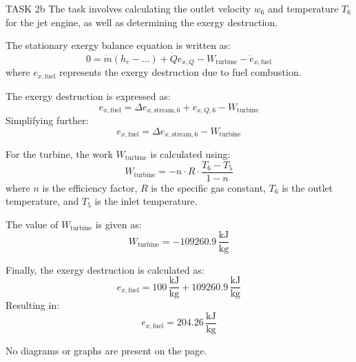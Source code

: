 TASK 2b  
The task involves calculating the outlet velocity \( w_6 \) and temperature \( T_6 \) for the jet engine, as well as determining the exergy destruction.

The stationary exergy balance equation is written as:  
\[
0 = \dot{m} \left( h_e - \ldots \right) + \dot{Q} e_{x,Q} - W_{\text{turbine}} - \dot{e}_{x,\text{fuel}}
\]  
where \( e_{x,\text{fuel}} \) represents the exergy destruction due to fuel combustion.  

The exergy destruction is expressed as:  
\[
e_{x,\text{fuel}} = \Delta e_{x,\text{stream},6} + e_{x,Q,6} - W_{\text{turbine}}
\]  
Simplifying further:  
\[
e_{x,\text{fuel}} = \Delta e_{x,\text{stream},6} - W_{\text{turbine}}
\]  

For the turbine, the work \( W_{\text{turbine}} \) is calculated using:  
\[
W_{\text{turbine}} = -n \cdot R \cdot \frac{T_6 - T_5}{1 - n}
\]  
where \( n \) is the efficiency factor, \( R \) is the specific gas constant, \( T_6 \) is the outlet temperature, and \( T_5 \) is the inlet temperature.  

The value of \( W_{\text{turbine}} \) is given as:  
\[
W_{\text{turbine}} = -109260.9 \, \frac{\text{kJ}}{\text{kg}}
\]  

Finally, the exergy destruction is calculated as:  
\[
e_{x,\text{fuel}} = 100 \, \frac{\text{kJ}}{\text{kg}} + 109260.9 \, \frac{\text{kJ}}{\text{kg}}
\]  
Resulting in:  
\[
e_{x,\text{fuel}} = 204.26 \, \frac{\text{kJ}}{\text{kg}}
\]  

No diagrams or graphs are present on the page.